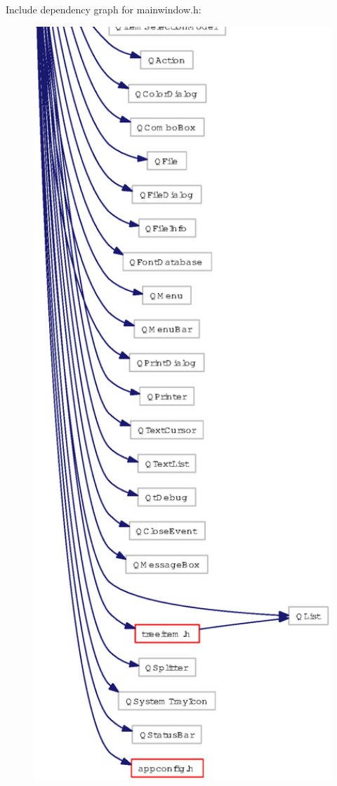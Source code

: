 Include dependency graph for mainwindow.h:\begin{figure}[H]
\begin{center}
\leavevmode
\includegraphics[width=366pt]{mainwindow_8h__incl}
\end{center}
\end{figure}


